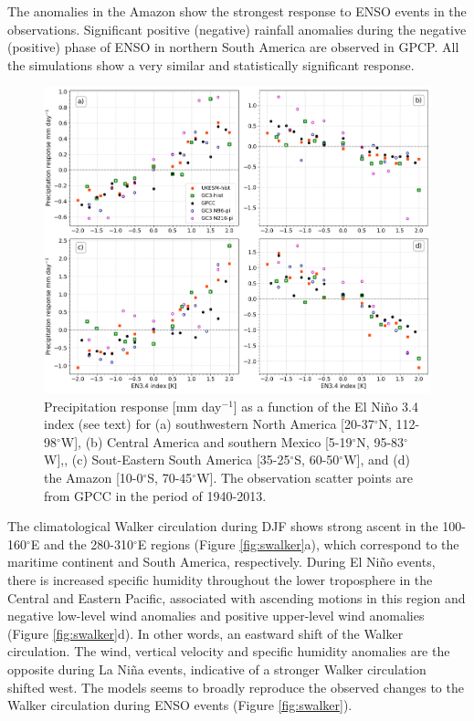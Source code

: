The anomalies in the Amazon show the strongest response to ENSO events in the observations. Significant positive (negative) rainfall anomalies during the negative (positive) phase of ENSO in northern South America are observed in GPCP. All the simulations show a very similar and statistically significant response.

\begin{figure}[t!]
\centering
 \includegraphics[width=\linewidth]{figures/fig_ensolinear}
\caption[Linearity of the precipitation response to ENSO events]{Precipitation response [mm day$^{-1}$] as a function of the El Ni\~no 3.4 index (see text) for (a) southwestern North America [20-37$^\circ$N, 112-98$^\circ$W], (b) Central America and southern Mexico [5-19$^\circ$N, 95-83$^\circ$W],, (c) Sout-Eastern South America [35-25$^\circ$S, 60-50$^\circ$W], and (d) the Amazon [10-0$^\circ$S, 70-45$^\circ$W]. The observation scatter points are from GPCC in the period of 1940-2013.}
\label{fig:12}
\end{figure}

The climatological Walker circulation during DJF shows strong ascent in the 100-160$^\circ$E and the 280-310$^\circ$E regions (Figure \ref{fig:swalker}a), which correspond to the maritime continent and South America, respectively. During El Ni\~no events, there is increased specific humidity throughout the lower troposphere in the Central and Eastern Pacific, associated with ascending motions in this region and negative low-level wind anomalies and positive upper-level wind anomalies (Figure \ref{fig:swalker}d). In other words, an eastward shift of the Walker circulation. The wind, vertical velocity and specific humidity anomalies are the opposite during La Niña events, indicative of a stronger Walker circulation shifted west. 
The models seems to broadly reproduce the observed changes to the Walker circulation during ENSO events (Figure \ref{fig:swalker}).


